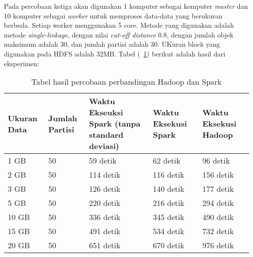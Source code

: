 Pada percobaan ketiga akan digunakan 1 komputer sebagai komputer \textit{master} dan 10 komputer sebagai \textit{worker} untuk memproses data-data yang berukuran berbeda. Setiap worker menggunakan 5 core. Metode yang digunakan adalah metode \textit{single-linkage}, dengan nilai \textit{cut-off distance} 0.8, dengan jumlah objek maksimum adalah 30, dan jumlah partisi adalah 30. UKuran block yang digunakan pada HDFS adalah 32MB. Tabel (~\ref{tab:spark10}) berikut adalah hasil dari eksperimen:

\begin{table}[H] 
	\centering 
	\caption{Tabel hasil percobaan perbandingan Hadoop dan Spark}
	\label{tab:spark10}
	\begin{tabular}{|p{1.5cm}|p{1cm}|p{4cm}|p{4cm}|p{3cm}|}
\hline
Ukuran Data & Jumlah Partisi & Waktu Ekseuksi Spark (tanpa standard deviasi) & Waktu Eksekusi Spark & Waktu Eksekusi Hadoop  \\
\hline
1 GB & 50 & 59 detik & 62 detik & 96 detik\\
\hline
2 GB & 50 & 114 detik & 116 detik & 156 detik\\
\hline
3 GB & 50 & 126 detik & 140 detik & 177 detik\\
\hline
5 GB & 50 & 220 detik & 216 detik & 294 detik\\
\hline
10 GB & 50 & 336 detik & 345 detik & 490 detik\\
\hline
15 GB & 50 & 491 detik & 534 detik & 732 detik\\
\hline
20 GB & 50 & 651 detik & 670 detik & 976 detik\\
\hline

\hline
	\end{tabular} 
\end{table}

\def\scl{1}
\def\leg{} 
\def\std{none}
\def\ymin{}
\def\ymax{}


